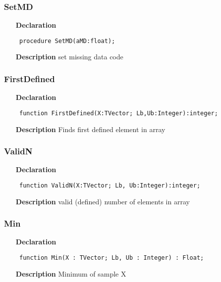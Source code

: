 \documentclass[12pt,a4paper,oneside]{report}
\newcommand{\declarationitem}[1]{\textbf{#1}}
\newcommand{\descriptiontitle}[1]{\textbf{#1}}
\newcommand{\code}[1]{\texttt{#1}}
\begin{document}
\subsubsection{SetMD}
\label{umeansd_md-SetMD}
\begin{itemize}\item[\declarationitem{Declaration}\hfill]
	\begin{flushleft}
		\code{
			procedure SetMD(aMD:float);}
	\end{flushleft}
	\item[\descriptiontitle{Description}]
	set missing data code
\end{itemize}
\subsubsection{FirstDefined}
\label{umeansd_md-FirstDefined}
\begin{itemize}\item[\declarationitem{Declaration}\hfill]
	\begin{flushleft}
		\code{
			function FirstDefined(X:TVector; Lb,Ub:Integer):integer;}
	\end{flushleft}
	\item[\descriptiontitle{Description}]
	Finds first defined element in array
\end{itemize}
\subsubsection{ValidN}
\label{umeansd_md-ValidN}
\begin{itemize}\item[\declarationitem{Declaration}\hfill]
	\begin{flushleft}
		\code{
			function ValidN(X:TVector; Lb, Ub:Integer):integer;}
	\end{flushleft}
	\item[\descriptiontitle{Description}]
	valid (defined) number of elements in array
\end{itemize}
\subsubsection{Min}
\label{umeansd_md-Min}
\begin{itemize}\item[\declarationitem{Declaration}\hfill]
	\begin{flushleft}
		\code{
			function Min(X : TVector; Lb, Ub : Integer) : Float;}
	\end{flushleft}
	\item[\descriptiontitle{Description}]
	Minimum of sample X
\end{itemize}
\end{document}
